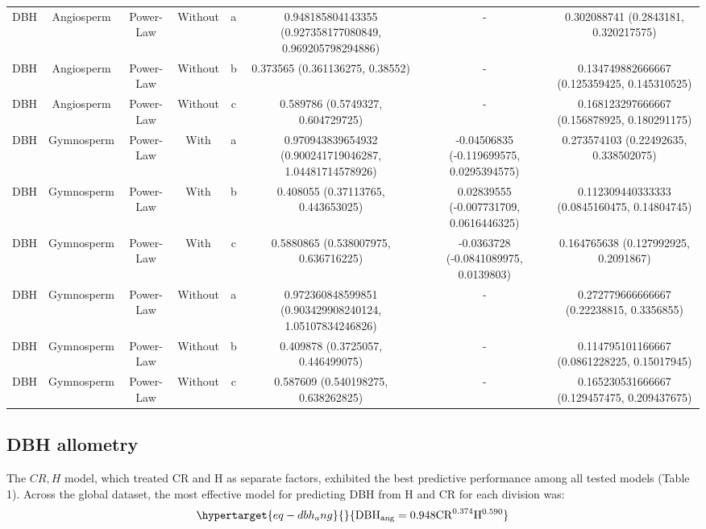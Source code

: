 \documentclass[
  12pt,
  letterpaper,
  DIV=11,
  numbers=noendperiod]{scrartcl}
\begin{document}
\begin{longtable*}[t]{cccccccc}
\addlinespace
DBH & Angiosperm & Power-Law & Without & a & 0.948185804143355 (0.927358177080849, 0.969205798294886) & - & 0.302088741 (0.2843181, 0.320217575)\\
DBH & Angiosperm & Power-Law & Without & b & 0.373565 (0.361136275, 0.38552) & - & 0.134749882666667 (0.125359425, 0.145310525)\\
DBH & Angiosperm & Power-Law & Without & c & 0.589786 (0.5749327, 0.604729725) & - & 0.168123297666667 (0.156878925, 0.180291175)\\
DBH & Gymnosperm & Power-Law & With & a & 0.970943839654932 (0.900241719046287, 1.04481714578926) & -0.04506835 (-0.119699575, 0.0295394575) & 0.273574103 (0.22492635, 0.338502075)\\
DBH & Gymnosperm & Power-Law & With & b & 0.408055 (0.37113765, 0.443653025) & 0.02839555 (-0.007731709, 0.0616446325) & 0.112309440333333 (0.0845160475, 0.14804745)\\
\addlinespace
DBH & Gymnosperm & Power-Law & With & c & 0.5880865 (0.538007975, 0.636716225) & -0.0363728 (-0.0841089975, 0.0139803) & 0.164765638 (0.127992925, 0.2091867)\\
DBH & Gymnosperm & Power-Law & Without & a & 0.972360848599851 (0.903429908240124, 1.05107834246826) & - & 0.272779666666667 (0.22238815, 0.3356855)\\
DBH & Gymnosperm & Power-Law & Without & b & 0.409878 (0.3725057, 0.446499075) & - & 0.114795101166667 (0.0861228225, 0.15017945)\\
DBH & Gymnosperm & Power-Law & Without & c & 0.587609 (0.540198275, 0.638262825) & - & 0.165230531666667 (0.129457475, 0.209437675)\\
\bottomrule
\end{longtable*}
\endgroup{}

\hypertarget{dbh-allometry}{%
\subsection{DBH allometry}\label{dbh-allometry}}

The \(CR,H\) model, which treated CR and H as separate factors,
exhibited the best predictive performance among all tested models (Table
1). Across the global dataset, the most effective model for predicting
DBH from H and CR for each division was:
\begin{equation}\protect\hypertarget{eq-dbh_ang}{}{
\mathrm{DBH_{ang}} = \mathrm{0.948}
\mathrm{CR}^{\text{0.374}}
\mathrm{H}^{\text{0.590}}
}\label{eq-dbh_ang}\end{equation}
\end{document}
